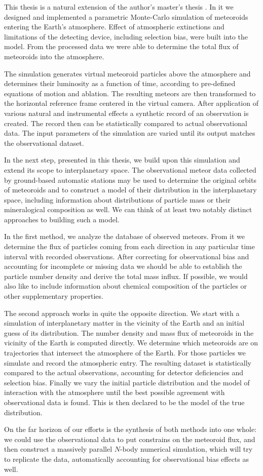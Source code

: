 This thesis is a natural extension of the author's master's thesis \citep{balaz-thesis}.
In it we designed and implemented a parametric Monte-Carlo simulation of meteoroids entering the Earth's atmosphere.
Effect of atmospheric extinctions and limitations of the detecting device, including selection bias, were built into the model.
From the processed data we were able to determine the total flux of meteoroids into the atmosphere.

The simulation generates virtual meteoroid particles above the atmosphere and determines their
luminosity as a function of time, according to pre-defined equations of motion and ablation.
The resulting meteors are then transformed to the horizontal reference frame centered in the virtual camera.
After application of various natural and instrumental effects a synthetic record of an observation is created.
The record then can be statistically compared to actual observational data.
The input parameters of the simulation are varied until its output matches the observational dataset.

In the next step, presented in this thesis, we build upon this simulation and extend its scope to interplanetary space.
The observational meteor data collected by ground-based automatic stations may be used
to determine the original orbits of meteoroids and to construct a model
of their distribution in the interplanetary space, including information
about distributions of particle mass or their mineralogical composition as well.
We can think of at least two notably distinct approaches to building such a model.

In the first method, we analyze the database of observed meteors. From it we determine
the flux of particles coming from each direction in any particular time interval with recorded observations.
After correcting for observational bias and accounting for incomplete or missing
data we should be able to establish the particle number density and derive the total mass influx.
If possible, we would also like to include information
about chemical composition of the particles or other supplementary properties.

The second approach works in quite the opposite direction. We start with a simulation
of interplanetary matter in the vicinity of the Earth and an initial guess of its distribution.
The number density and mass flux of meteoroids in the vicinity of the Earth is computed directly.
We determine which meteoroids are on trajectories that intersect the atmosphere of the Earth.
For those particles we simulate and record the atmospheric entry. The resulting dataset is statistically compared
to the actual observations, accounting for detector deficiencies and selection bias.
Finally we vary the initial particle distribution and the model of interaction with the atmosphere
until the best possible agreement with observational data is found.
This is then declared to be the model of the true distribution.

On the far horizon of our efforts is the synthesis of both methods into one whole:
we could use the observational data to put constrains on the meteoroid flux,
and then construct a massively parallel $N$-body numerical simulation,
which will try to replicate the data, automatically accounting for observational bias effects as well.
